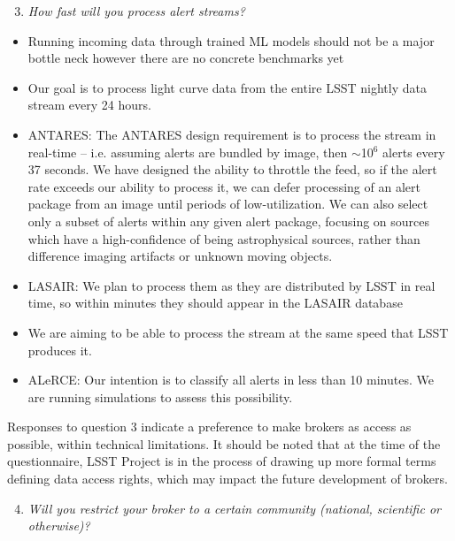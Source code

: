 \documentclass{article}
\begin{document}
\begin{enumerate}
\setcounter{enumi}{2}
\item {\em How fast will you process alert streams?}
\end{enumerate}

\begin{itemize}
\item Running incoming data through trained ML models should not be a major bottle neck however there are no concrete benchmarks yet 
\item Our goal is to process light curve data from the entire LSST nightly data stream every 24 hours.
\item ANTARES: The ANTARES design requirement is to process the stream in real-time -- i.e. assuming alerts are bundled by image, then $\sim$10$^{6}$ alerts every 37 seconds. We have designed the ability to throttle the feed, so if the alert rate exceeds our ability to process it, we can defer processing of an alert package from an image until periods of low-utilization. We can also select only a subset of alerts within any given alert package, focusing on sources which have a high-confidence of being astrophysical sources, rather than difference imaging artifacts or unknown moving objects.
\item LASAIR: We plan to process them as they are distributed by LSST in real time, so within minutes they should appear in the LASAIR database 
\item We are aiming to be able to process the stream at the same speed that LSST produces it.
\item ALeRCE: Our intention is to classify all alerts in less than 10 minutes. We are running simulations to assess this possibility.
\end{itemize}

Responses to question 3 indicate a preference to make brokers as access as possible, within technical limitations.  It should be noted that at the time of the questionnaire, LSST Project is in the process of drawing up more formal terms defining data access rights, which may impact the future development of brokers. 

\begin{enumerate}
\setcounter{enumi}{3}
\item {\em Will you restrict your broker to a certain community (national, scientific or otherwise)?}
\end{enumerate}
\end{document}
